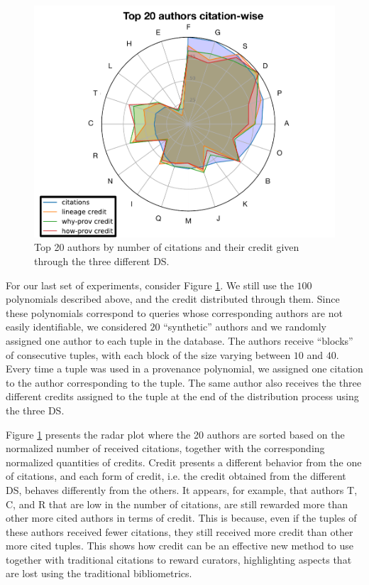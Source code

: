 \begin{figure}[]
\centering
  \includegraphics[width=.8\textwidth]{figures/radar_top_synthetic_enhanced}
  \caption{Top 20 authors by number of citations and their credit given through the three different DS.}
  \label{figure:synthetic_authors}
\end{figure}

For our last set of experiments, consider Figure \ref{figure:synthetic_authors}.
We still use the $100$ polynomials described above, and the credit distributed through them. Since these polynomials correspond to queries whose corresponding authors are not easily identifiable, we considered $20$ ``synthetic'' authors and we randomly assigned one author to each tuple in the database. The authors receive ``blocks'' of consecutive tuples, with each block of the size varying between $10$ and $40$. 
Every time a tuple was used in a provenance polynomial, we assigned one citation to the author corresponding to the tuple.  The same author also receives the three different credits assigned to the tuple at the end of the distribution process using the three DS.

Figure \ref{figure:synthetic_authors} presents the radar plot where the 20 authors are sorted based on the normalized number of received citations, together with the corresponding normalized quantities of credits.
Credit presents a different behavior from the one of citations, and each form of credit, i.e. the credit obtained from the different DS, behaves differently from the others.
It appears, for example, that authors T, C, and R that are low in the number of citations, are still rewarded more than other more cited authors in terms of credit.
This is because, even if the tuples of these authors received fewer citations, they still received more credit than other more cited tuples. This shows how credit can be an effective new method to use together with traditional citations to reward curators, highlighting aspects that are lost using the traditional bibliometrics.

